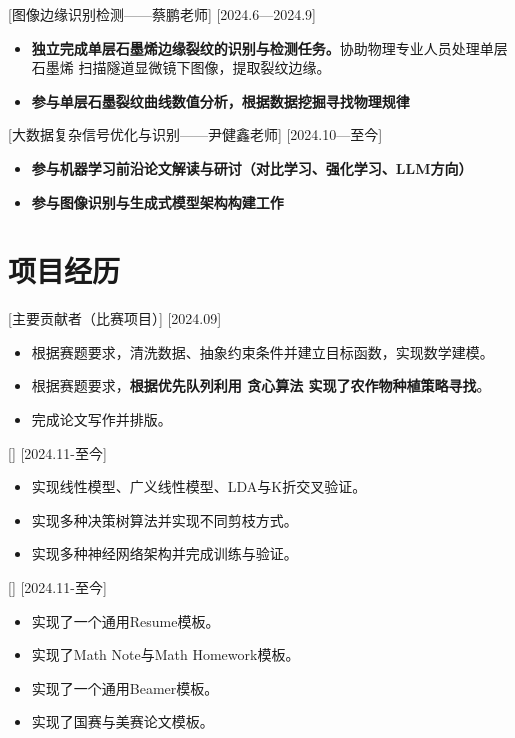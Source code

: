 \documentclass{resume}
\begin{document}
[图像边缘识别检测——蔡鹏老师]
[2024.6—2024.9] 

\begin{itemize}
  \item \textbf{独立完成单层石墨烯边缘裂纹的识别与检测任务。}协助物理专业人员处理单层石墨烯
  扫描隧道显微镜下图像，提取裂纹边缘。
  \item \textbf{参与单层石墨裂纹曲线数值分析，根据数据挖掘寻找物理规律}
\end{itemize}

[大数据复杂信号优化与识别——尹健鑫老师]
[2024.10—至今] 
\begin{itemize}
  \item \textbf{参与机器学习前沿论文解读与研讨（对比学习、强化学习、LLM方向）}
  \item \textbf{参与图像识别与生成式模型架构构建工作}
\end{itemize}

\section{项目经历}

[主要贡献者（比赛项目）]
[2024.09]

\begin{itemize}
  \item 根据赛题要求，清洗数据、抽象约束条件并建立目标函数，实现数学建模。
  \item 根据赛题要求，\textbf{根据优先队列利用 贪心算法 实现了农作物种植策略寻找}。
  \item 完成论文写作并排版。
\end{itemize}

[]
[2024.11-至今]
\begin{itemize}
  \item 实现线性模型、广义线性模型、LDA与K折交叉验证。
  \item 实现多种决策树算法并实现不同剪枝方式。
  \item 实现多种神经网络架构并完成训练与验证。
\end{itemize}

[]
[2024.11-至今]
\begin{itemize}
  \item 实现了一个通用Resume模板。
  \item 实现了Math Note与Math Homework模板。
  \item 实现了一个通用Beamer模板。
  \item 实现了国赛与美赛论文模板。
\end{itemize}
\end{document}
